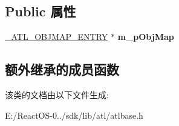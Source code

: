 \subsection*{Public 属性}
\begin{DoxyCompactItemize}
\item 
\mbox{\label{class_a_t_l_1_1_c_com_module_af37a73be9d714c55a9ef2ea6ac673a45}} 
\hyperlink{struct_a_t_l_1_1___a_t_l___o_b_j_m_a_p___e_n_t_r_y30}{\+\_\+\+A\+T\+L\+\_\+\+O\+B\+J\+M\+A\+P\+\_\+\+E\+N\+T\+RY} $\ast$ {\bfseries m\+\_\+p\+Obj\+Map}
\end{DoxyCompactItemize}
\subsection*{额外继承的成员函数}


该类的文档由以下文件生成\+:\begin{DoxyCompactItemize}
\item 
E\+:/\+React\+O\+S-\/0../sdk/lib/atl/atlbase.\+h\end{DoxyCompactItemize}
